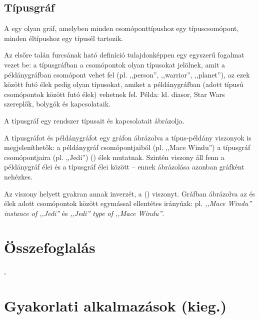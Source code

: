 \subsection{Típusgráf}

\begin{definicio}
A  egy olyan gráf, amelyben minden csomóponttípushoz egy típuscsomópont, minden éltípushoz egy típusél tartozik.
\end{definicio}

Az elsőre talán furcsának ható definíció tulajdonképpen egy egyszerű fogalmat vezet be: a típusgráfban a csomópontok olyan típusokat jelölnek, amit a példánygráfban csomópont vehet fel (pl. ,,person'', ,,warrior'', ,,planet''), az ezek között futó élek pedig olyan típusokat, amiket a példánygráfban (adott típusú csomópontok között futó élek) vehetnek fel. Példa: ld. diasor, Star Wars szereplők, bolygók és kapcsolataik.

A típusgráf egy rendszer  típusait és kapcsolatait ábrázolja.

A típusgráfot és példánygráfot egy gráfon ábrázolva a típus-példány viszonyok is megjeleníthetők: a példánygráf csomópontjaiból (pl. ,,Mace Windu'') a típusgráf csomópontjaira (pl. ,,Jedi'')  () élek mutatnak. Szintén  viszony áll fenn a példánygráf élei és a típusgráf élei között -- ennek ábrázolása azonban gráfként nehézkes.

Az  viszony helyett gyakran annak inverzét, a  () viszonyt. Gráfban ábrázolva az  és  élek adott csomópontok között egymással ellentétes irányúak: pl. \emph{,,Mace Windu'' instance of ,,Jedi''} és \emph{,,Jedi'' type of ,,Mace Windu''}.


\section{Összefoglalás}

, 


\section{Gyakorlati alkalmazások (kieg.)}

